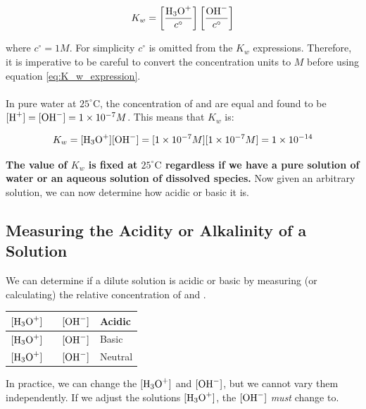 \documentclass[12pt]{article}
\newcommand\T{\rule{0pt}{5.0ex}}       %
\newcommand\B{\rule[-4.0ex]{0pt}{0pt}} %
\begin{document}
\begin{equation}
    K_{w} = \left[\frac{\ce{H3O+}}{c^{\circ}}\right]\left[\frac{\ce{OH-}}{c^{\circ}}\right]
\end{equation}

\noindent where $c^{\circ} = 1 M$. For simplicity $c^{\circ}$ is omitted from the $K_{w}$ expressions. Therefore, it is imperative to be careful to convert the concentration units to $M$ before using equation \ref{eq:K_w_expression}.
\\
\\
\noindent In pure water at $25^{\circ}\text{C}$, the concentration of  and  are equal and found to be $[\ce{H+}] = [\ce{OH-}] = 1 \times 10^{-7} M$. This means that $K_{w}$ is:

\begin{equation}
    K_{w} = [\ce{H3O+}][\ce{OH-}] = [1 \times 10^{-7} M][1 \times 10^{-7} M] = 1 \times 10^{-14}
\end{equation}

\noindent \textbf{The value of $K_{w}$ is fixed at $25^{\circ}\text{C}$ regardless if we have a pure solution of water or an aqueous solution of dissolved species.} Now given an arbitrary solution, we can now determine how acidic or basic it is.

\subsection{Measuring the Acidity or Alkalinity of a Solution}

\noindent We can determine if a dilute solution is acidic or basic by measuring (or calculating) the relative concentration of  and .

\begin{center}
\begin{tabularx}{0.8\textwidth}{| >{\centering\arraybackslash}X | >{\centering\arraybackslash}X | }
    \hline
    $[\ce{H3O+}] \quad\quad [\ce{OH-}]$ & Acidic  \T\B \\
    \hline
    $[\ce{H3O+}] \quad\quad [\ce{OH-}]$ & Basic  \T\B \\
    \hline
    $[\ce{H3O+}] \quad\quad [\ce{OH-}]$ & Neutral  \T\B \\
    \hline
\end{tabularx}
\end{center}

\noindent In practice, we can change the $[\ce{H3O+}]$ and $[\ce{OH-}]$, but we cannot vary them independently. If we adjust the solutions $[\ce{H3O+}]$, the $[\ce{OH-}]$ \textit{must} change to.
\end{document}
